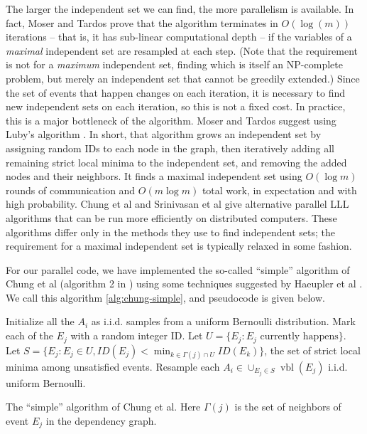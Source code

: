 \documentclass[twocolumn]{article}
\begin{document}
The larger the independent set we can find, the more parallelism is available.  In fact, Moser and Tardos prove that the algorithm terminates in $O(\log(m))$ iterations -- that is, it has sub-linear computational depth -- if the variables of a \emph{maximal} independent set are resampled at each step.  (Note that the requirement is not for a \emph{maximum} independent set, finding which is itself an NP-complete problem, but merely an independent set that cannot be greedily extended.)  Since the set of events that happen changes on each iteration, it is necessary to find new independent sets on each iteration, so this is not a fixed cost.  In practice, this is a major bottleneck of the algorithm.  Moser and Tardos suggest using Luby's algorithm \cite{luby1986simple}.  In short, that algorithm grows an independent set by assigning random IDs to each node in the graph, then iteratively adding all remaining strict local minima to the independent set, and removing the added nodes and their neighbors.  It finds a maximal independent set using $O(\log m)$ rounds of communication and $O(m \log m)$ total work, in expectation and with high probability.  Chung et al \cite{chung2014distributed} and Srinivasan et al \cite{haeupler2011new} give alternative parallel LLL algorithms that can be run more efficiently on distributed computers.  These algorithms differ only in the methods they use to find independent sets; the requirement for a maximal independent set is typically relaxed in some fashion.


For our parallel code, we have implemented the so-called ``simple'' algorithm of Chung et al (algorithm 2 in \cite{chung2014distributed}) using some techniques suggested by Haeupler et al \cite{haeupler2011new}.  We call this algorithm \ref{alg:chung-simple}, and pseudocode is given below.

\begin{algorithm}[H]
\label{alg:chung-simple}
\begin{algorithmic}
\State Initialize all the $A_i$ as i.i.d. samples from a uniform Bernoulli distribution.
\State Mark each of the $E_j$ with a random integer ID.
  \State Let $U = \{E_j: E_j\text{ currently happens}\}$. 
  \State Let $S = \{E_j: E_j \in U, ID(E_j) < \min_{k \in \Gamma(j) \cap U} ID(E_k)\}$, the set of strict local minima among unsatisfied events.
  \State Resample each $A_i \in \cup_{E_j \in S} \operatorname{vbl}(E_j)$ i.i.d. uniform Bernoulli.
\EndWhile
\end{algorithmic}
\caption{The ``simple'' algorithm of Chung et al.  Here $\Gamma(j)$ is the set of neighbors of event $E_j$ in the dependency graph.}
\end{algorithm}
\end{document}
